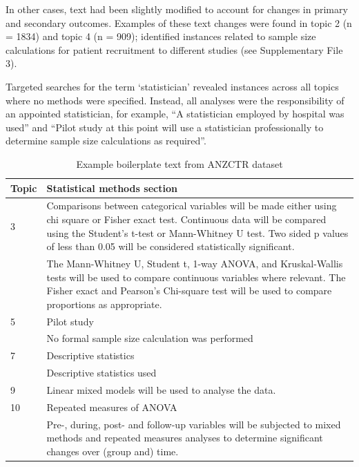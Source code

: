 \documentclass[12pt]{article}
\begin{document}
In other cases, text had been slightly modified to account for changes
in primary and secondary outcomes. Examples of these text changes were
found in topic 2 (n = 1834) and topic 4 (n = 909); identified instances
related to sample size calculations for patient recruitment to different
studies (see Supplementary File 3).

Targeted searches for the term `statistician' revealed
instances across all topics where no methods were specified. Instead,
all analyses were the responsibility of an appointed statistician, for
example, ``A statistician employed by hospital was used'' and ``Pilot
study at this point will use a statistician professionally to determine
sample size calculations as required''.

\begin{landscape}
\begin{table}[]
\centering
\caption{Example boilerplate text from ANZCTR dataset}
\label{tab:anzctr-example-boilerplate}
\begin{tabular}{p{0.1\linewidth} p{0.9\linewidth}}
\hline
\textbf{Topic} & \textbf{Statistical methods section} \\ \hline
3 & Comparisons between categorical variables will be made either using chi square or Fisher exact test. Continuous data will be compared using the Student’s t-test or Mann-Whitney U test. Two sided p values of less than 0.05 will be considered statistically significant.\\
 &  The Mann-Whitney U, Student t, 1-way ANOVA, and Kruskal-Wallis tests will be used to compare continuous variables where relevant. The Fisher exact and Pearson’s Chi-square test will be used to compare proportions as appropriate. \\ \hline
5 & Pilot study \\
 &  No formal sample size calculation was performed \\ \hline
7 & Descriptive statistics \\
 &  Descriptive statistics used \\ \hline
9 & Linear mixed models will be used to analyse the data. \\ \hline
10 & Repeated measures of ANOVA \\
 &  Pre-, during, post- and follow-up variables will be subjected to mixed methods and repeated measures analyses to determine significant changes over (group and) time. \\ \hline
\end{tabular}
\end{table}
\end{landscape}
\end{document}
